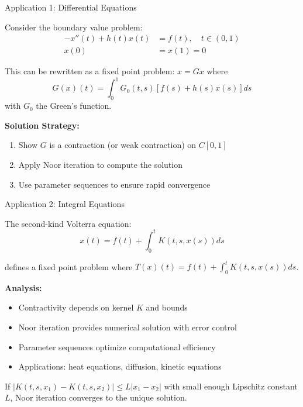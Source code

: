 \documentclass[aspectratio=169,10pt]{beamer}
\begin{document}
\begin{frame}{Application 1: Differential Equations}

\begin{example}
Consider the boundary value problem:
\begin{align*}
-x''(t) + h(t)x(t) &= f(t), \quad t \in (0,1)\\
x(0) &= x(1) = 0
\end{align*}

This can be rewritten as a fixed point problem: $x = Gx$ where
$$G(x)(t) = \int_0^1 G_0(t,s)[f(s) + h(s)x(s)] ds$$
with $G_0$ the Green's function.
\end{example}

\vspace{0.2cm}

\textbf{Solution Strategy:}
\begin{enumerate}
  \item Show $G$ is a contraction (or weak contraction) on $C[0,1]$
  \item Apply Noor iteration to compute the solution
  \item Use parameter sequences to ensure rapid convergence
\end{enumerate}

\end{frame}

\begin{frame}{Application 2: Integral Equations}

\begin{example}
The second-kind Volterra equation:
$$x(t) = f(t) + \int_0^t K(t,s,x(s)) ds$$

defines a fixed point problem where $T(x)(t) = f(t) + \int_0^t K(t,s,x(s)) ds$.
\end{example}

\vspace{0.3cm}

\textbf{Analysis:}
\begin{itemize}
  \item Contractivity depends on kernel $K$ and bounds
  \item Noor iteration provides numerical solution with error control
  \item Parameter sequences optimize computational efficiency
  \item Applications: heat equations, diffusion, kinetic equations
\end{itemize}

\vspace{0.3cm}

\begin{theorem}
If $|K(t,s,x_1) - K(t,s,x_2)| \leq L|x_1 - x_2|$ with small enough Lipschitz constant $L$, Noor iteration converges to the unique solution.
\end{theorem}

\end{frame}
\end{document}
